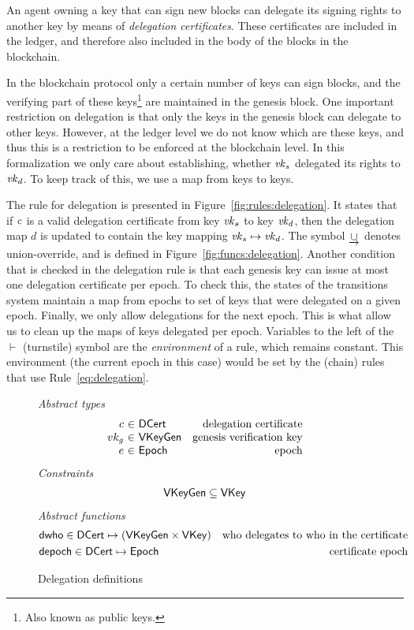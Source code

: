 \newcommand{\DCert}{\type{DCert}}
\newcommand{\DState}{\type{DState}}

An agent owning a key that can sign new blocks can delegate its signing rights
to another key by means of \textit{delegation certificates}. These certificates
are included in the ledger, and therefore also included in the body of the
blocks in the blockchain.

In the blockchain protocol only a certain number of keys can sign blocks, and
the verifying part of these keys\footnote{Also known as public keys.} are
maintained in the genesis block. One important restriction on delegation is
that only the keys in the genesis block can delegate to other keys. However, at
the ledger level we do not know which are these keys, and thus this is a
restriction to be enforced at the blockchain level. In this formalization we
only care about establishing, whether $\mathit{vk}_s$ delegated its rights to
$\mathit{vk}_d$. To keep track of this, we use a map from keys to keys.

The rule for delegation is presented in
Figure~\ref{fig:rules:delegation}. It states that if $\mathit{c}$ is a valid
delegation certificate from key $\mathit{vk}_s$ to key $\mathit{vk}_d$, then the
delegation map $d$ is updated to contain the key mapping
$\mathit{vk}_s \mapsto \mathit{vk}_d$. The symbol $\mathbin{\underrightarrow\cup}$ denotes
union-override, and is defined in Figure~\ref{fig:funcs:delegation}. Another
condition that is checked in the delegation rule is that each genesis key can
issue at most one delegation certificate per epoch. To check this, the states
of the transitions system maintain a map from epochs to set of keys that were
delegated on a given epoch. Finally, we only allow delegations for the next
epoch. This is what allow us to clean up the maps of keys delegated per epoch.
Variables to the left of the $\vdash$ (turnstile) symbol are the
\textit{environment} of a rule, which remains constant. This environment (the
current epoch in this case) would be set by the (chain) rules that use
Rule~\ref{eq:delegation}.

\begin{figure}
  \emph{Abstract types}
  \begin{equation*}
    \begin{array}{r@{~\in~}lr}
      c & \DCert & \text{delegation certificate}\\
      vk_g & \VKeyGen & \text{genesis verification key}\\
      e & \Epoch & \text{epoch}\\
    \end{array}
  \end{equation*}
  \emph{Constraints}
  \begin{align*}
    \mathsf{VKeyGen} \subseteq \mathsf{VKey}
  \end{align*}
  \emph{Abstract functions}
  \begin{align*}
    & \fun{dwho} \in \DCert \mapsto (\VKeyGen \times \VKey) & \text{who delegates to who in the certificate}\\
    & \fun{depoch} \in \DCert \mapsto \Epoch & \text{certificate epoch}
  \end{align*}
  \caption{Delegation definitions}
  \label{fig:defs:delegation}
\end{figure}

